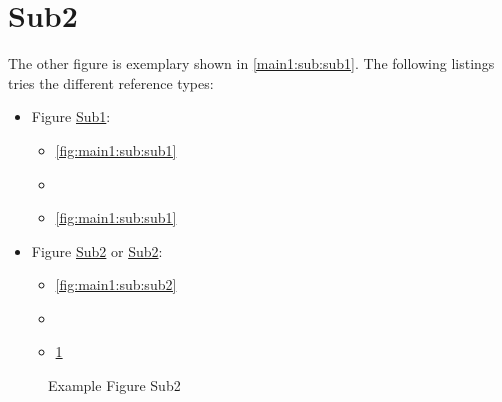 \section[Sub2]{Sub2}\label{main1:sub:sub2}

The other figure is exemplary shown in \autoref{main1:sub:sub1}. The following listings tries the different reference types:
\begin{itemize}
    \item Figure \hyperref[fig:main1:sub:sub1]{Sub1}:
        \begin{itemize}
            \item \autoref{fig:main1:sub:sub1}
            \item {}
            \item \ref{fig:main1:sub:sub1}
        \end{itemize}
    \item Figure \hyperref[fig:main1:sub:sub2]{Sub2} or \hyperref[{fig:main1:sub:sub2}]{Sub2}:
        \begin{itemize}
            \item \autoref{fig:main1:sub:sub2}
            \item {}
            \item \ref{fig:main1:sub:sub2}
        \end{itemize}
\end{itemize}


\begin{figure}[!ht]
    \caption[{Main1; Sub; Sub2}]{Example Figure Sub2}
    \label{fig:main1:sub:sub2}
\end{figure}

